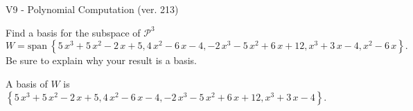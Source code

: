 \begin{exercise}
  \begin{exerciseTitle}V9 - Polynomial Computation (ver. 213)\end{exerciseTitle}
  \begin{exerciseStatement}
    Find a basis for the subspace of \(\mathcal{P}^3\) 
\[W=\mathrm{span}\ \left\{5 \, x^{3} + 5 \, x^{2} - 2 \, x + 5 , 4 \, x^{2} - 6 \, x - 4 , -2 \, x^{3} - 5 \, x^{2} + 6 \, x + 12 , x^{3} + 3 \, x - 4 , x^{2} - 6 \, x\right\}.\]
 Be sure to explain why your result is a basis.


  \end{exerciseStatement}
  \begin{exerciseAnswer}
   A basis of \(W\) is  \(\left\{5 \, x^{3} + 5 \, x^{2} - 2 \, x + 5 , 4 \, x^{2} - 6 \, x - 4 , -2 \, x^{3} - 5 \, x^{2} + 6 \, x + 12 , x^{3} + 3 \, x - 4\right\}\).
  


  \end{exerciseAnswer}
\end{exercise}